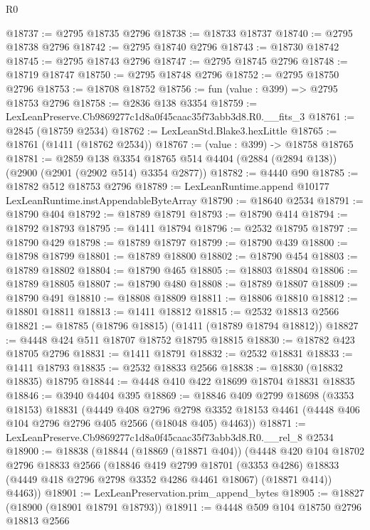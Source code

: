 \begin{lexlean}{R0}
\begin{coremodule}
@18737 := @2795 @18735 @2796
@18738 := @18733 @18737
@18740 := @2795 @18738 @2796
@18742 := @2795 @18740 @2796
@18743 := @18730 @18742
@18745 := @2795 @18743 @2796
@18747 := @2795 @18745 @2796
@18748 := @18719 @18747
@18750 := @2795 @18748 @2796
@18752 := @2795 @18750 @2796
@18753 := @18708 @18752
@18756 := fun (value : @399) => @2795 @18753 @2796
@18758 := @2836 @138 @3354
@18759 := LexLeanPreserve.Cb9869277c1d8a0f45caac35f73abb3d8.R0.__fits_3
@18761 := @2845 (@18759 @2534)
@18762 := LexLeanStd.Blake3.hexLittle
@18765 := @18761 (@1411 (@18762 @2534))
@18767 := (value : @399) -> @18758 @18765
@18781 := @2859
    @138
    @3354
    @18765
    @514
    @4404
    (@2884 (@2894 @138))
    (@2900 (@2901 (@2902 @514) @3354 @2877))
@18782 := @4440 @90
@18785 := @18782 @512 @18753 @2796
@18789 := LexLeanRuntime.append @10177 LexLeanRuntime.instAppendableByteArray
@18790 := @18640 @2534
@18791 := @18790 @404
@18792 := @18789 @18791
@18793 := @18790 @414
@18794 := @18792 @18793
@18795 := @1411 @18794
@18796 := @2532 @18795
@18797 := @18790 @429
@18798 := @18789 @18797
@18799 := @18790 @439
@18800 := @18798 @18799
@18801 := @18789 @18800
@18802 := @18790 @454
@18803 := @18789 @18802
@18804 := @18790 @465
@18805 := @18803 @18804
@18806 := @18789 @18805
@18807 := @18790 @480
@18808 := @18789 @18807
@18809 := @18790 @491
@18810 := @18808 @18809
@18811 := @18806 @18810
@18812 := @18801 @18811
@18813 := @1411 @18812
@18815 := @2532 @18813 @2566
@18821 := @18785 (@18796 @18815) (@1411 (@18789 @18794 @18812))
@18827 := @4448 @424 @511 @18707 @18752 @18795 @18815
@18830 := @18782 @423 @18705 @2796
@18831 := @1411 @18791
@18832 := @2532 @18831
@18833 := @1411 @18793
@18835 := @2532 @18833 @2566
@18838 := @18830 (@18832 @18835) @18795
@18844 := @4448 @410 @422 @18699 @18704 @18831 @18835
@18846 := @3940 @4404 @395
@18869 := @18846
    @409
    @2799
    @18698
    (@3353 @18153)
    @18831
    (@4449
      @408
      @2796
      @2798
      @3352
      @18153
      @4461
      (@4448 @406 @104 @2796 @2796 @405 @2566 (@18048 @405) @4463))
@18871 := LexLeanPreserve.Cb9869277c1d8a0f45caac35f73abb3d8.R0.__rel_8 @2534
@18900 := @18838
    (@18844
      (@18869 (@18871 @404))
      (@4448
        @420
        @104
        @18702
        @2796
        @18833
        @2566
        (@18846
          @419
          @2799
          @18701
          (@3353 @4286)
          @18833
          (@4449 @418 @2796 @2798 @3352 @4286 @4461 @18067)
          (@18871 @414))
        @4463))
@18901 := LexLeanPreservation.prim_append_bytes
@18905 := @18827 (@18900 (@18901 @18791 @18793))
@18911 := @4448 @509 @104 @18750 @2796 @18813 @2566

\end{coremodule}
\end{lexlean}
